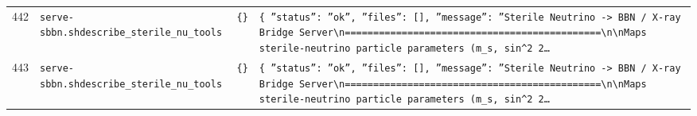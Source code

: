 \documentclass[11pt,a4paper]{article}
\begin{document}
\begin{longtable}{@{}p{}p{}p{}p{}@{}}
442 & \texttt{serve-sbbn.sh}\newline\texttt{describe\_\allowbreak{}sterile\_\allowbreak{}nu\_\allowbreak{}tools} & \texttt{\{\}\allowbreak{}} & \texttt{\{   ''status'':\allowbreak{} ''ok'',\allowbreak{}   ''files'':\allowbreak{} []\allowbreak{},\allowbreak{}   ''message'':\allowbreak{} ''Sterile Neutrino -\textgreater{}\allowbreak{} BBN /\allowbreak{} X-ray Bridge Server\textbackslash{}\allowbreak{}n=\allowbreak{}=\allowbreak{}=\allowbreak{}=\allowbreak{}=\allowbreak{}=\allowbreak{}=\allowbreak{}=\allowbreak{}=\allowbreak{}=\allowbreak{}=\allowbreak{}=\allowbreak{}=\allowbreak{}=\allowbreak{}=\allowbreak{}=\allowbreak{}=\allowbreak{}=\allowbreak{}=\allowbreak{}=\allowbreak{}=\allowbreak{}=\allowbreak{}=\allowbreak{}=\allowbreak{}=\allowbreak{}=\allowbreak{}=\allowbreak{}=\allowbreak{}=\allowbreak{}=\allowbreak{}=\allowbreak{}=\allowbreak{}=\allowbreak{}=\allowbreak{}=\allowbreak{}=\allowbreak{}=\allowbreak{}=\allowbreak{}=\allowbreak{}=\allowbreak{}=\allowbreak{}=\allowbreak{}=\allowbreak{}=\allowbreak{}=\allowbreak{}\textbackslash{}\allowbreak{}n\textbackslash{}\allowbreak{}nMaps sterile-neutrino particle parameters (m\_\allowbreak{}s,\allowbreak{} sin\textasciicircum{}\allowbreak{}2 2\ldots{}\allowbreak{}} \\
443 & \texttt{serve-sbbn.sh}\newline\texttt{describe\_\allowbreak{}sterile\_\allowbreak{}nu\_\allowbreak{}tools} & \texttt{\{\}\allowbreak{}} & \texttt{\{   ''status'':\allowbreak{} ''ok'',\allowbreak{}   ''files'':\allowbreak{} []\allowbreak{},\allowbreak{}   ''message'':\allowbreak{} ''Sterile Neutrino -\textgreater{}\allowbreak{} BBN /\allowbreak{} X-ray Bridge Server\textbackslash{}\allowbreak{}n=\allowbreak{}=\allowbreak{}=\allowbreak{}=\allowbreak{}=\allowbreak{}=\allowbreak{}=\allowbreak{}=\allowbreak{}=\allowbreak{}=\allowbreak{}=\allowbreak{}=\allowbreak{}=\allowbreak{}=\allowbreak{}=\allowbreak{}=\allowbreak{}=\allowbreak{}=\allowbreak{}=\allowbreak{}=\allowbreak{}=\allowbreak{}=\allowbreak{}=\allowbreak{}=\allowbreak{}=\allowbreak{}=\allowbreak{}=\allowbreak{}=\allowbreak{}=\allowbreak{}=\allowbreak{}=\allowbreak{}=\allowbreak{}=\allowbreak{}=\allowbreak{}=\allowbreak{}=\allowbreak{}=\allowbreak{}=\allowbreak{}=\allowbreak{}=\allowbreak{}=\allowbreak{}=\allowbreak{}=\allowbreak{}=\allowbreak{}=\allowbreak{}\textbackslash{}\allowbreak{}n\textbackslash{}\allowbreak{}nMaps sterile-neutrino particle parameters (m\_\allowbreak{}s,\allowbreak{} sin\textasciicircum{}\allowbreak{}2 2\ldots{}\allowbreak{}} \\

\end{longtable}
\end{document}
